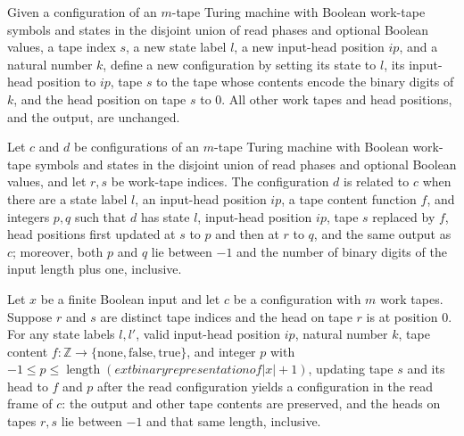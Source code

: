 \begin{definition}
\label{Complexity.LogProg.readAt}
\leanok
{}
Given a configuration of an $m$-tape Turing machine with Boolean work-tape symbols and
states in the disjoint union of read phases and optional Boolean values, a tape index
$s$, a new state label $l$, a new input-head position $ip$, and a natural number $k$,
define a new configuration by setting its state to $l$, its input-head position to $ip$,
tape $s$ to the tape whose contents encode the binary digits of $k$, and the head
position on tape $s$ to $0$. All other work tapes and head positions, and the output,
are unchanged.
\end{definition}

\begin{definition}
\label{Complexity.LogProg.readFrame}
\leanok
{}
Let $c$ and $d$ be configurations of an $m$-tape Turing machine with Boolean work-tape
symbols and states in the disjoint union of read phases and optional Boolean values, and
let $r,s$ be work-tape indices. The configuration $d$ is related to $c$ when there are a
state label $l$, an input-head position $ip$, a tape content function $f$, and integers
$p,q$ such that $d$ has state $l$, input-head position $ip$, tape $s$ replaced by $f$,
head positions first updated at $s$ to $p$ and then at $r$ to $q$, and the same output
as $c$; moreover, both $p$ and $q$ lie between $-1$ and the number of binary digits of
the input length plus one, inclusive.
\end{definition}

\begin{theorem}
\label{Complexity.LogProg.readFrame_reg}
\leanok
{}
Let $x$ be a finite Boolean input and let $c$ be a configuration with $m$ work tapes.
Suppose $r$ and $s$ are distinct tape indices and the head on tape $r$ is at position
$0$. For any state labels $l,l'$, valid input-head position $ip$, natural number $k$,
tape content $f:\mathbb Z\to\{\mathrm{none},\mathrm{false},\mathrm{true}\}$, and integer
$p$ with $-1\le p\le \operatorname{length}(	ext{binary representation of }|x|+1)$,
updating tape $s$ and its head to $f$ and $p$ after the read configuration yields a
configuration in the read frame of $c$: the output and other tape contents are
preserved, and the heads on tapes $r,s$ lie between $-1$ and that same length,
inclusive.
\end{theorem}

